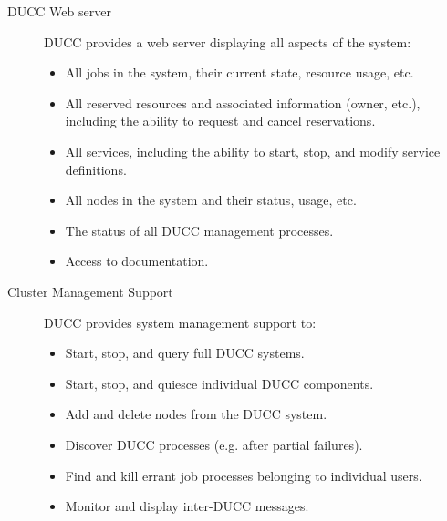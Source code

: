 \begin{description}
        \item[DUCC Web server] DUCC  provides a web server displaying all aspects of the system:
          \begin{itemize}
              \item All jobs in the system, their current state, resource usage, etc.
                
              \item All reserved resources and associated information (owner, etc.),
                including the ability to request and cancel reservations.
                
              \item All services, including the ability to start, stop, and modify
                service definitions.
                
              \item All nodes in the system and their status, usage, etc. 
                                
              \item The status of all DUCC management processes.  

              \item Access to documentation.
          \end{itemize}


        \item[Cluster Management Support] DUCC provides system management support to:
          \begin{itemize}
              \item Start, stop, and query full DUCC systems.
 
              \item Start, stop, and quiesce individual DUCC components.
 
              \item Add and delete nodes from the DUCC system.
 
              \item Discover DUCC processes (e.g. after partial failures).
 
              \item Find and kill errant job processes belonging to individual users.
                
              \item Monitor and display inter-DUCC messages.
          \end{itemize}
      \end{description}

